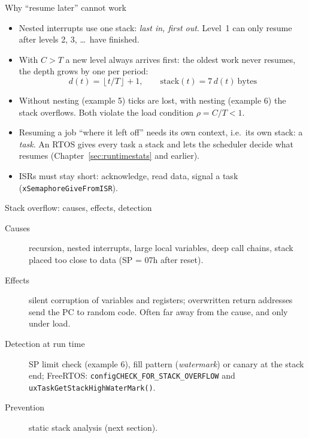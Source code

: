 \begin{frame}{Why ``resume later'' cannot work}
  \begin{itemize}
    \item Nested interrupts use one stack: \emph{last in, first out}. Level~1 can only resume after levels 2, 3, \dots\ have finished.
    \item With $C > T$ a new level always arrives first: the oldest work never resumes, the depth grows by one per period:
    \[ d(t) = \left\lfloor t/T \right\rfloor + 1, \qquad \text{stack}(t) = 7\,d(t)\ \text{bytes} \]
    \item Without nesting (example 5) ticks are lost, with nesting (example 6) the stack overflows. Both violate the load condition $\rho = C/T < 1$.
    \item Resuming a job ``where it left off'' needs its own context, i.e.\ its own stack: a \emph{task}. An RTOS gives every task a stack and lets the scheduler decide what resumes (Chapter~\ref{sec:runtimestats} and earlier).
    \item ISRs must stay short: acknowledge, read data, signal a task (\texttt{xSemaphoreGiveFromISR}).
  \end{itemize}
\end{frame}


\begin{frame}{Stack overflow: causes, effects, detection}
  \begin{description}
    \item[Causes] recursion, nested interrupts, large local variables, deep call chains, stack placed too close to data (SP = 07h after reset).
    \item[Effects] silent corruption of variables and registers; overwritten return addresses send the PC to random code. Often far away from the cause, and only under load.
    \item[Detection at run time] SP limit check (example 6), fill pattern (\emph{watermark}) or canary at the stack end; FreeRTOS: \texttt{configCHECK\_FOR\_STACK\_OVERFLOW} and \texttt{uxTaskGetStackHighWaterMark()}.
    \item[Prevention] static stack analysis (next section).
  \end{description}
\end{frame}

